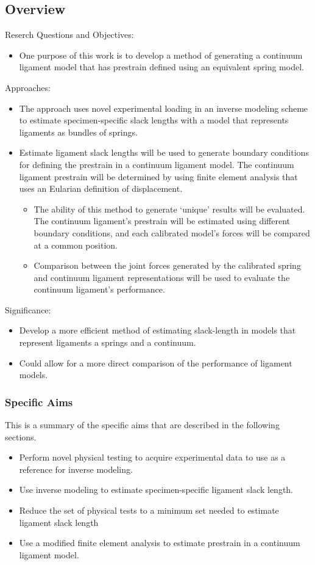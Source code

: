 \documentclass{article}
\begin{document}
\subsection{Overview}
Reserch Questions and Objectives:
\begin{itemize}
    \item One purpose of this work is to develop a method of generating a continuum ligament model that has prestrain defined using an equivalent spring model.
\end{itemize}
Approaches:
\begin{itemize}
    \item The approach uses novel experimental loading in an inverse modeling scheme to estimate specimen-specific slack lengths with a model that represents ligaments as bundles of springs.
    \item Estimate ligament slack lengths will be used to generate boundary conditions for defining the prestrain in a continuum ligament model. The continuum ligament prestrain will be determined by using finite element analysis that uses an Eularian definition of displacement.
    \begin{itemize}
        \item The ability of this method to generate `unique' results will be evaluated. The continuum ligament's prestrain will be estimated using different boundary conditions, and each calibrated model's forces will be compared at a common position.
        \item Comparison between the joint forces generated by the calibrated spring and continuum ligament representations will be used to evaluate the continuum ligament's performance.
    \end{itemize}
\end{itemize}
Significance:
\begin{itemize}
    \item Develop a more efficient method of estimating slack-length in models that represent ligaments a springs and a continuum.
    \item Could allow for a more direct comparison of the performance of ligament models.
\end{itemize}
\subsubsection{Specific Aims}
This is a summary of the specific aims that are described in the following sections.
\begin{itemize}
    \item Perform novel physical testing to acquire experimental data to use as a reference for inverse modeling.
    \item Use inverse modeling to estimate specimen-specific ligament slack length.
    \item Reduce the set of physical tests to a minimum set needed to estimate ligament slack length
    \item Use a modified finite element analysis to estimate prestrain in a continuum ligament model.
\end{itemize}
\end{document}
